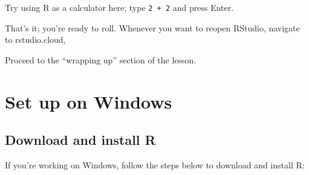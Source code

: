 \documentclass[
  letterpaper,
  DIV=11,
  numbers=noendperiod]{scrreprt}
\begin{document}
Try using R as a calculator here; type \texttt{2\ +\ 2} and press Enter.

That's it; you're ready to roll. Whenever you want to reopen RStudio,
navigate to rstudio.cloud,

Proceed to the ``wrapping up'' section of the lesson.

\hypertarget{set-up-on-windows-1}{%
\section{Set up on Windows}\label{set-up-on-windows-1}}

\hypertarget{download-and-install-r-2}{%
\subsection{Download and install R}\label{download-and-install-r-2}}

If you're working on Windows, follow the steps below to download and
install R:
\end{document}
